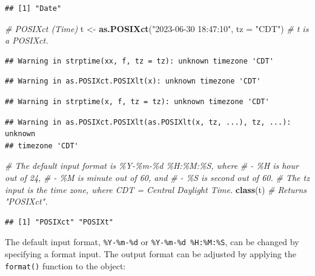 \documentclass[
]{book}
\newenvironment{Shaded}{\begin{snugshade}}{\end{snugshade}}
\newcommand{\AttributeTok}[1]{\textcolor[rgb]{0.13,0.29,0.53}{#1}}
\newcommand{\CommentTok}[1]{\textcolor[rgb]{0.56,0.35,0.01}{\textit{#1}}}
\newcommand{\FunctionTok}[1]{\textcolor[rgb]{0.13,0.29,0.53}{\textbf{#1}}}
\newcommand{\NormalTok}[1]{#1}
\newcommand{\OtherTok}[1]{\textcolor[rgb]{0.56,0.35,0.01}{#1}}
\newcommand{\StringTok}[1]{\textcolor[rgb]{0.31,0.60,0.02}{#1}}
\begin{document}
\begin{verbatim}
## [1] "Date"
\end{verbatim}

\begin{Shaded}
\begin{Highlighting}[]
\CommentTok{\# POSIXct (Time)}
\NormalTok{t }\OtherTok{\textless{}{-}} \FunctionTok{as.POSIXct}\NormalTok{(}\StringTok{"2023{-}06{-}30 18:47:10"}\NormalTok{, }\AttributeTok{tz =} \StringTok{"CDT"}\NormalTok{)  }\CommentTok{\# t is a POSIXct.}
\end{Highlighting}
\end{Shaded}

\begin{verbatim}
## Warning in strptime(xx, f, tz = tz): unknown timezone 'CDT'
\end{verbatim}

\begin{verbatim}
## Warning in as.POSIXct.POSIXlt(x): unknown timezone 'CDT'
\end{verbatim}

\begin{verbatim}
## Warning in strptime(x, f, tz = tz): unknown timezone 'CDT'
\end{verbatim}

\begin{verbatim}
## Warning in as.POSIXct.POSIXlt(as.POSIXlt(x, tz, ...), tz, ...): unknown
## timezone 'CDT'
\end{verbatim}

\begin{Shaded}
\begin{Highlighting}[]
\CommentTok{\# The default input format is \%Y{-}\%m{-}\%d \%H:\%M:\%S, where}
\CommentTok{\# {-} \%H is hour out of 24,}
\CommentTok{\# {-} \%M is minute out of 60, and}
\CommentTok{\# {-} \%S is second out of 60.}
\CommentTok{\# The tz input is the time zone, where CDT = Central Daylight Time.}
\FunctionTok{class}\NormalTok{(t)  }\CommentTok{\# Returns "POSIXct".}
\end{Highlighting}
\end{Shaded}

\begin{verbatim}
## [1] "POSIXct" "POSIXt"
\end{verbatim}

The default input format, \texttt{\%Y-\%m-\%d} or \texttt{\%Y-\%m-\%d\ \%H:\%M:\%S}, can be changed by specifying a format input. The output format can be adjusted by applying the \texttt{format()} function to the object:
\end{document}
